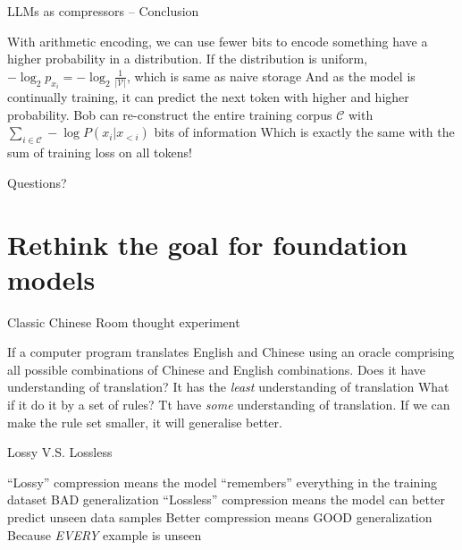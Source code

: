 \documentclass[scheme=plain]{ctexbeamer}
\begin{document}
\begin{frame}{LLMs as compressors -- Conclusion}
  \begin{outline}
    \1 With arithmetic encoding, we can use fewer bits to encode something have a higher probability in a distribution.
      \2 If the distribution is uniform, $-\log_2 p_{x_i} = -\log_2 \frac{1}{|\mathcal{V}|}$, which is same as naive storage
      \2 And as the model is continually training, it can predict the next token with higher and higher probability.
    \1 Bob can re-construct the entire training corpus $\mathcal{C}$ with $\sum_{i \in \mathcal{C}} - \log P(x_i | x_{<i}) $ bits of information
      \2 Which is exactly the same with the sum of training loss on all tokens!
  \end{outline}
\end{frame}

\begin{frame}[standout]
  Questions?
\end{frame}

\section[LLM, compression and AGI]{Rethink the goal for foundation models}

\begin{frame}{Classic Chinese Room thought experiment}
  \begin{outline}
    \1 If a computer program translates English and Chinese using an oracle comprising all possible combinations of Chinese and English combinations.
      \2 Does it have understanding of translation?
    \pause
      \2 It has the \emph{least} understanding of translation
    \pause
    \1 What if it do it by a set of rules?
      \2 Tt have \emph{some} understanding of translation.
    \pause
    \1 If we can make the rule set smaller, it will generalise better.
  \end{outline}
\end{frame}

\begin{frame}{Lossy V.S. Lossless}
  \begin{outline}
    \1 ``Lossy'' compression means the model ``remembers'' everything in the training dataset
      \2 BAD generalization
    \1 ``Lossless'' compression means the model can better predict unseen data samples
      \2 Better compression means GOOD generalization
        \3 Because \emph{EVERY} example is unseen
  \end{outline}
\end{frame}
\end{document}
